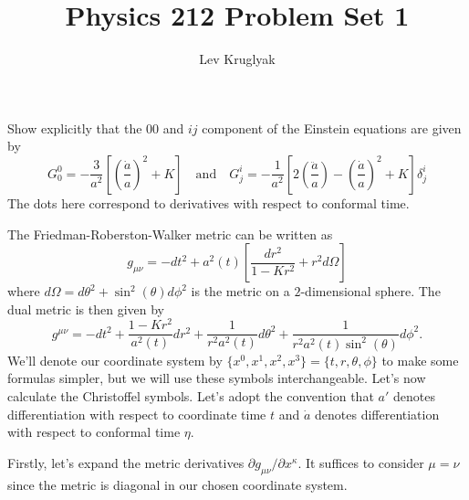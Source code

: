 \documentclass{lkx_pset}
\title{Physics 212 Problem Set 1}
\author{Lev Kruglyak}
\begin{document}
\maketitle

\begin{problem}{1}
Show explicitly that the $00$ and $ij$ component of the Einstein equations are given by
\[
	G^0_0 = -\frac{3}{a^2}\left[\left(\frac{\dot{a}}{a}\right)^2+ K\right]
	\quad\textrm{and}\quad
	G^i_j = -\frac{1}{a^2}\left[2\left(\frac{\ddot{a}}{a}\right)-\left(\frac{\dot{a}}{a}\right)^2+ K\right]\delta^i_j
\]
The dots here correspond to derivatives with respect to conformal time.
\end{problem}
\begin{solution}
	The Friedman-Roberston-Walker metric can be written as
	\[
		g_{\mu\nu} = -dt^2 +a^2(t)\left[\frac{dr^2}{1-Kr^2}+r^2d\Omega\right]
	\]
	where $d\Omega = d\theta^2 + \sin^2(\theta)d\phi^2$ is the metric on a $2$-dimensional sphere. The dual metric is then given by
	\[
		g^{\mu\nu} = -dt^2 +\frac{1-Kr^2}{a^2(t)}dr^2 + \frac{1}{r^2a^2(t)}d\theta^2 + \frac{1}{r^2a^2(t)\sin^2(\theta)}d\phi^2.
	\]
	We'll denote our coordinate system by $\{x^0, x^1, x^2, x^3\} = \{t, r, \theta, \phi\}$ to make some formulas simpler, but we will use these symbols interchangeable. Let's now calculate the Christoffel symbols. Let's adopt the convention that $a'$ denotes differentiation with respect to coordinate time $t$ and $\dot{a}$ denotes differentiation with respect to conformal time $\eta$.

	Firstly, let's expand the metric derivatives $\partial g_{\mu\nu}/\partial x^\kappa$. It suffices to consider $\mu=\nu$ since the metric is diagonal in our chosen coordinate system.


\end{solution}
\end{document}
